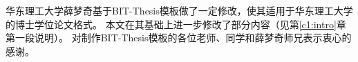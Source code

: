 
\begin{thanks}

华东理工大学薛梦奇基于BIT-Thesis模板做了一定修改，使其适用于华东理工大学的博士学位论文格式。
本文在其基础上进一步修改了部分内容（见第\ref{c1:intro}章第一段说明）。
对制作BIT-Thesis模板的各位老师、同学和薛梦奇师兄表示衷心的感谢。

\end{thanks}
